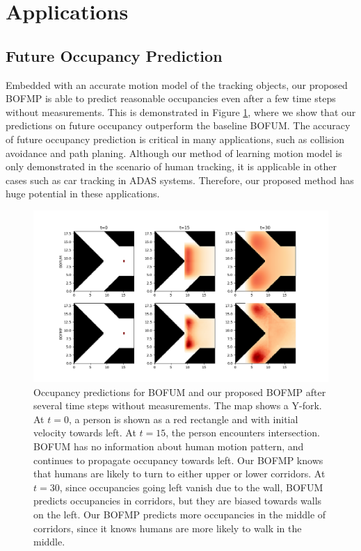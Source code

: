 \section{Applications} \label{sec:application}

\subsection{Future Occupancy Prediction}

Embedded with an accurate motion model of the tracking objects, our proposed BOFMP is able to predict reasonable occupancies even after a few time steps without measurements. This is demonstrated in Figure \ref{fig:idea}, where we show that our predictions on future occupancy outperform the baseline BOFUM. The accuracy of future occupancy prediction is critical in many applications, such as collision avoidance and path planing. Although our method of learning motion model is only demonstrated in the scenario of human tracking, it is applicable in other cases such as car tracking in ADAS systems. Therefore, our proposed method has huge potential in these applications. 

\begin{figure}[ht]
  \centering
    \includegraphics[width=\textwidth]{figures/idea.png}
    \caption[Occupancy predictions for BOFUM and our proposed BOFMP.]{Occupancy predictions for BOFUM and our proposed BOFMP after several time steps without measurements. The map shows a Y-fork. At $t=0$, a person is shown as a red rectangle and with initial velocity towards left. At $t=15$, the person encounters intersection. BOFUM has no information about human motion pattern, and continues to propagate occupancy towards left. Our BOFMP knows that humans are likely to turn to either upper or lower corridors. At $t=30$, since occupancies going left vanish due to the wall, BOFUM predicts occupancies in corridors, but they are biased towards walls on the left. Our BOFMP predicts more occupancies in the middle of corridors, since it knows humans are more likely to walk in the middle.}
    \label{fig:idea}
\end{figure}

